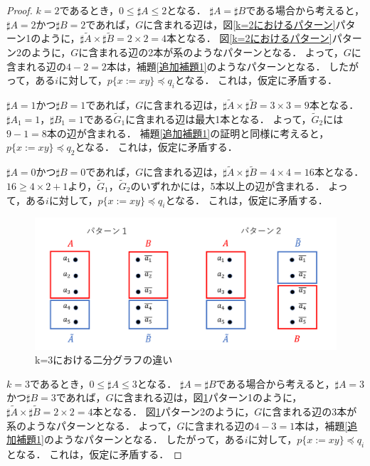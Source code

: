 \begin{proof}
$k=2$であるとき，$0 \le \sharp A \le 2$となる．
$\sharp A = \sharp B$である場合から考えると，$\sharp A=2$かつ$\sharp B=2$であれば，$G$に含まれる辺は，図\ref{k=2におけるパターン}パターン1のように，$\sharp\tilde{A} \times \sharp\tilde{B}=2 \times 2=4$本となる．
図\ref{k=2におけるパターン}パターン2のように，$G$に含まれる辺の2本が系のようなパターンとなる．
よって，$G$に含まれる辺の$4-2=2$本は，補題\ref{追加補題1}のようなパターンとなる．
したがって，ある$i$に対して，$p \{ x:=xy \} \preceq q_{i}$となる．
これは，仮定に矛盾する．

$\sharp A=1$かつ$\sharp B=1$であれば，$G$に含まれる辺は，$\sharp\tilde{A} \times \sharp\tilde{B}=3 \times 3=9$本となる．
$\sharp A_{1}=1，\sharp B_{1}=1$である$\tilde{G}_{1}$に含まれる辺は最大1本となる．
よって，$\tilde{G}_{2}$には$9-1=8$本の辺が含まれる．
補題\ref{追加補題1}の証明と同様に考えると，$p \{ x:= xy \} \preceq q_{2}$となる．
これは，仮定に矛盾する．

$\sharp A=0$かつ$\sharp B=0$であれば，$G$に含まれる辺は，$\sharp\tilde{A} \times \sharp\tilde{B}=4 \times 4=16$本となる．
$16 \ge 4 \times 2 + 1$より，$\tilde{G}_{1}，\tilde{G}_{2}$のいずれかには，5本以上の辺が含まれる．
よって，ある$i$に対して，$p \{ x:=xy \} \preceq q_{i}$となる．
これは，仮定に矛盾する．

\begin{figure}[H]
\includegraphics[width=\linewidth]{画像/k=3におけるパターン.png}
\caption{\scriptsize k=3における二分グラフの違い}
\label{k=3におけるパターン}
\end{figure}

$k=3$であるとき，$0 \le \sharp A \le 3$となる．
$\sharp A = \sharp B$である場合から考えると，$\sharp A=3$かつ$\sharp B=3$であれば，$G$に含まれる辺は，図\ref{k=3におけるパターン}パターン1のように，$\sharp\tilde{A} \times \sharp\tilde{B}=2 \times 2=4$本となる．
図\ref{k=3におけるパターン}パターン2のように，$G$に含まれる辺の3本が系のようなパターンとなる．
よって，$G$に含まれる辺の$4-3=1$本は，補題\ref{追加補題1}のようなパターンとなる．
したがって，ある$i$に対して，$p \{ x:=xy \} \preceq q_{i}$となる．
これは，仮定に矛盾する．


\end{proof}
